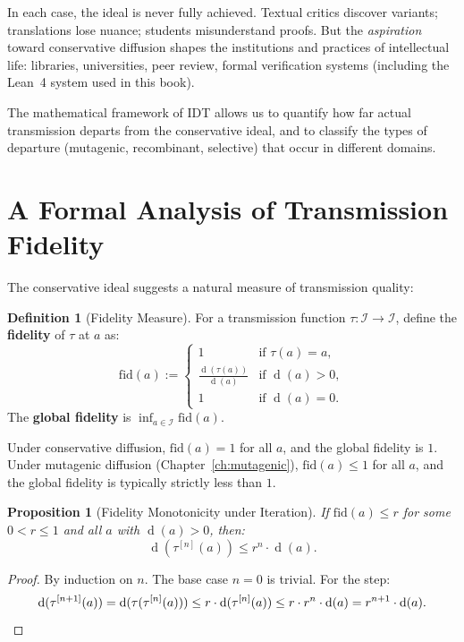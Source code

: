 \documentclass[11pt,openany]{book}
\theoremstyle{definition}
\newtheorem{definition}[axiom]{Definition}
\theoremstyle{plain}
\newtheorem{proposition}[axiom]{Proposition}
\theoremstyle{remark}
\newcommand{\IS}{\mathcal{I}}               %
\newcommand{\depth}{\operatorname{d}}       %
\newcommand{\transmit}{\tau}                 %
\begin{document}
In each case, the ideal is never fully achieved. Textual critics discover variants; translations lose nuance; students misunderstand proofs. But the \emph{aspiration} toward conservative diffusion shapes the institutions and practices of intellectual life: libraries, universities, peer review, formal verification systems (including the Lean~4 system used in this book).

The mathematical framework of IDT allows us to quantify how far actual transmission departs from the conservative ideal, and to classify the types of departure (mutagenic, recombinant, selective) that occur in different domains.

\section{A Formal Analysis of Transmission Fidelity}

The conservative ideal suggests a natural measure of transmission quality:

\begin{definition}[Fidelity Measure]
For a transmission function $\transmit : \IS \to \IS$, define the \textbf{fidelity} of $\transmit$ at $a$ as:
\[
\mathrm{fid}(a) := \begin{cases} 1 & \text{if } \transmit(a) = a, \\ \frac{\depth(\transmit(a))}{\depth(a)} & \text{if } \depth(a) > 0, \\ 1 & \text{if } \depth(a) = 0. \end{cases}
\]
The \textbf{global fidelity} is $\inf_{a \in \IS} \mathrm{fid}(a)$.
\end{definition}

Under conservative diffusion, $\mathrm{fid}(a) = 1$ for all $a$, and the global fidelity is $1$. Under mutagenic diffusion (Chapter~\ref{ch:mutagenic}), $\mathrm{fid}(a) \leq 1$ for all $a$, and the global fidelity is typically strictly less than $1$.

\begin{proposition}[Fidelity Monotonicity under Iteration]
If $\mathrm{fid}(a) \leq r$ for some $0 < r \leq 1$ and all $a$ with $\depth(a) > 0$, then:
\[
\depth(\transmit^{[n]}(a)) \leq r^n \cdot \depth(a).
\]
\end{proposition}

\begin{proof}
By induction on $n$. The base case $n = 0$ is trivial. For the step:
\[
\depth(\transmit^{[n+1]}(a)) = \depth(\transmit(\transmit^{[n]}(a))) \leq r \cdot \depth(\transmit^{[n]}(a)) \leq r \cdot r^n \cdot \depth(a) = r^{n+1} \cdot \depth(a). \qedhere
\]
\end{proof}
\end{document}
